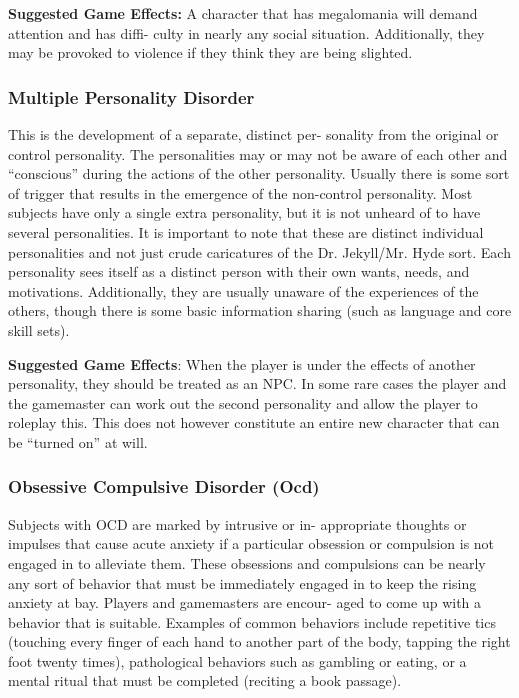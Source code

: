 \textbf{Suggested Game Effects: }A character that has 
megalomania will demand attention and has diffi-
culty in nearly any social situation. Additionally, they 
may be provoked to violence if they think they are 
being slighted.

\subsubsection{Multiple Personality Disorder}

This is the development of a separate, distinct per-
sonality from the original or control personality. 
The personalities may or may not be aware of each 
other and ``conscious'' during the actions of the other 
personality. Usually there is some sort of trigger that 
results in the emergence of the non-control personality. 
Most subjects have only a single extra personality, but 
it is not unheard of to have several personalities. It 
is important to note that these are distinct individual 
personalities and not just crude caricatures of the Dr. 
Jekyll/Mr. Hyde sort. Each personality sees itself as 
a distinct person with their own wants, needs, and 
motivations. Additionally, they are usually unaware 
of the experiences of the others, though there is some 
basic information sharing (such as language and core 
skill sets).

\textbf{Suggested Game Effects}: When the player is under 
the effects of another personality, they should be 
treated as an NPC. In some rare cases the player and 
the gamemaster can work out the second personality 
and allow the player to roleplay this. This does not 
however constitute an entire new character that can 
be ``turned on'' at will.

\subsubsection{Obsessive Compulsive Disorder (Ocd)}

Subjects with OCD are marked by intrusive or in-
appropriate thoughts or impulses that cause acute 
anxiety if a particular obsession or compulsion is not 
engaged in to alleviate them. These obsessions and 
compulsions can be nearly any sort of behavior that 
must be immediately engaged in to keep the rising 
anxiety at bay. Players and gamemasters are encour-
aged to come up with a behavior that is suitable. 
Examples of common behaviors include repetitive 
tics (touching every finger of each hand to another 
part of the body, tapping the right foot twenty times), 
pathological behaviors such as gambling or eating, 
or a mental ritual that must be completed (reciting a 
book passage).

